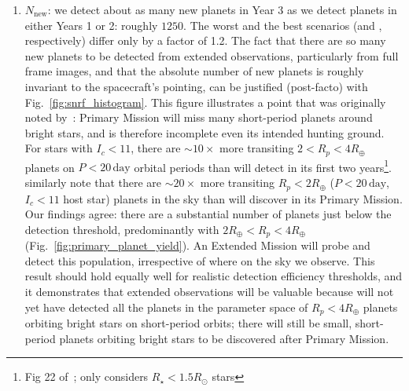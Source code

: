 \begin{enumerate}
	\item $N_\mathrm{new}$: we detect about as many new planets in Year 3 as we detect planets in either Years 1 or 2: roughly $1250$.
	The worst and the best scenarios (\elong\:and \hemis, respectively) differ 
	only by a factor of 1.2.
	The fact that there are so many new planets to be detected from extended 
	observations, particularly from full frame images, and that the absolute 
	number of new planets is roughly invariant to the spacecraft's pointing, 
	can be justified (post-facto) with Fig.~\ref{fig:snrf_histogram}.
	This figure illustrates a point that was originally noted by~:
        \tesss Primary Mission will miss many short-period planets around bright stars, and is therefore
        incomplete even its intended hunting ground.
        For stars with $I_c<11$, there are $\sim\! 10\times$ more transiting 
        $2<R_p<4R_\oplus$ planets on $P<20\,\mathrm{day}$ orbital periods than 
        \tess will detect in its first two years\footnote{Fig 22
        of~; only considers $R_\star<1.5R_\odot$ 
        stars}.
         similarly note that there are $\sim\! 
        20\times$ more transiting $R_p<2R_\oplus$ ($P<20\,\mathrm{day}$, 
        $I_c<11$ host star) planets in the sky than \tess will discover in 
        its Primary Mission.
	Our findings agree: there are a substantial number of planets just below the detection threshold, predominantly with $2R_\oplus < R_p <4R_\oplus$ (Fig.~\ref{fig:primary_planet_yield}).
	An Extended Mission will probe and detect this population, irrespective of where on the sky we observe.
	This result should hold equally well for realistic detection efficiency 
	thresholds, and it demonstrates that extended observations will be valuable 
	because \tess will not yet have detected all the planets in the parameter 
	space of $R_p<4R_\oplus$ planets orbiting bright stars on short-period 
	orbits;
	there will still be small, short-period planets orbiting bright stars to 
	be discovered after \tesss Primary Mission.



\end{enumerate}
